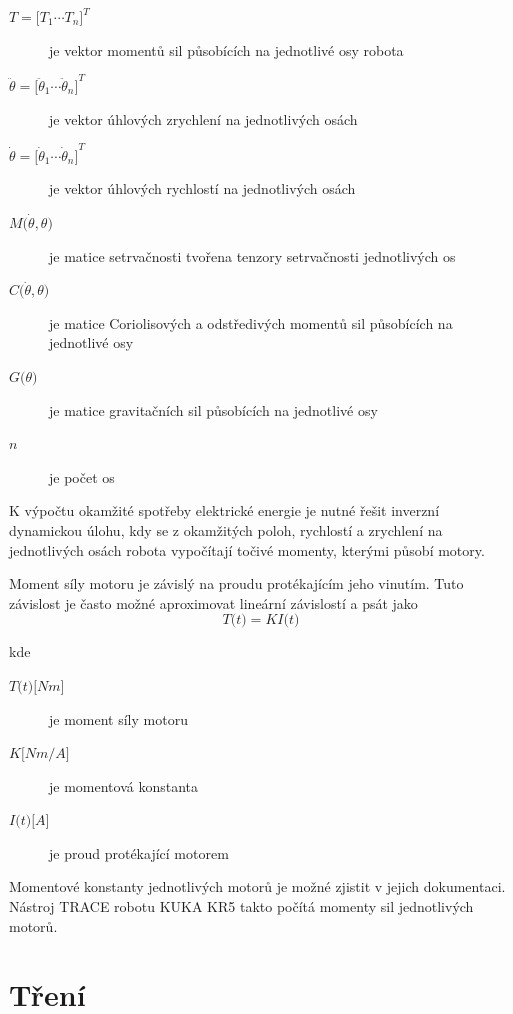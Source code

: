 \begin{description}
\item[$T = {\big[T_1  \dotsm  T_n\big]}^{T}$] je vektor momentů sil působících na jednotlivé osy robota
\item[$\ddot \theta = {\big[\ddot \theta_1  \dotsm  \ddot \theta_n\big]}^{T}$] je vektor úhlových zrychlení na jednotlivých osách
\item[$\dot \theta = {\big[\dot \theta_1  \dotsm  \dot \theta_n\big]}^{T}$] je vektor úhlových rychlostí na jednotlivých osách
\item[$M\big(\dot \theta, \theta\big)$] je matice setrvačnosti tvořena tenzory setrvačnosti jednotlivých os
\item[$C\big(\dot \theta, \theta\big)$] je matice Coriolisových a odstředivých momentů sil působících na jednotlivé osy
\item[$G\big(\theta\big)$] je matice gravitačních sil působících na jednotlivé osy
\item[$n$] je počet os
\end{description}

K výpočtu okamžité spotřeby elektrické energie je nutné řešit inverzní dynamickou úlohu, kdy se z okamžitých poloh, rychlostí a zrychlení na jednotlivých osách robota vypočítají točivé momenty, kterými působí motory. 

Moment síly motoru je závislý na proudu protékajícím jeho vinutím. Tuto závislost je často možné aproximovat lineární závislostí a psát jako
\begin{equation}
T\big(t\big) = KI\big(t\big)
\label{torque_current_eq}
\end{equation}

kde

\begin{description}
\item[$T\big(t\big) {\big[Nm\big]}$] je moment síly motoru 
\item[$K {\big[Nm/A\big]}$] je momentová konstanta 
\item[$I\big(t\big) {\big[A\big]}$] je proud protékající motorem 
\end{description}

Momentové konstanty jednotlivých motorů je možné zjistit v jejich dokumentaci. Nástroj TRACE robotu KUKA KR5 takto počítá momenty sil jednotlivých motorů. 

\section{Tření}

